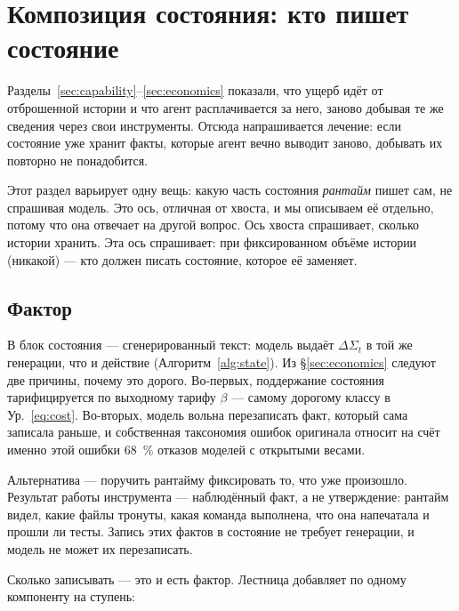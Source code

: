 \section{Композиция состояния: кто пишет состояние}
\label{sec:composition}

Разделы~\ref{sec:capability}--\ref{sec:economics} показали, что ущерб идёт от
отброшенной истории и что агент расплачивается за него, заново добывая те же
сведения через свои инструменты. Отсюда напрашивается лечение: если состояние
уже хранит факты, которые агент вечно выводит заново, добывать их повторно
не понадобится.

Этот раздел варьирует одну вещь: какую часть состояния \emph{рантайм} пишет
сам, не спрашивая модель. Это ось, отличная от хвоста, и мы описываем её
отдельно, потому что она отвечает на другой вопрос. Ось хвоста спрашивает,
сколько истории хранить. Эта ось спрашивает: при фиксированном объёме
истории (никакой) — кто должен писать состояние, которое её заменяет.



\subsection{Фактор}

В \SkillState{} блок состояния — сгенерированный текст: модель выдаёт
$\Delta\Sigma_t$ в той же генерации, что и действие
(Алгоритм~\ref{alg:state}). Из \S\ref{sec:economics} следуют две причины,
почему это дорого. Во-первых, поддержание состояния тарифицируется по
выходному тарифу $\beta$ — самому дорогому классу в Ур.~\eqref{eq:cost}.
Во-вторых, модель вольна перезаписать факт, который сама записала раньше, и
собственная таксономия ошибок оригинала относит на счёт именно этой ошибки
\SI{68}{\percent} отказов моделей с открытыми весами\origin.

Альтернатива — поручить рантайму фиксировать то, что уже произошло.
Результат работы инструмента — наблюдённый факт, а не утверждение: рантайм
видел, какие файлы тронуты, какая команда выполнена, что она напечатала и
прошли ли тесты. Запись этих фактов в состояние не требует генерации, и
модель не может их перезаписать.

Сколько записывать — это и есть фактор. Лестница добавляет по одному
компоненту на ступень:

